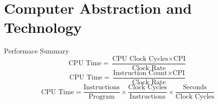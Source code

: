 \section{Computer Abstraction and Technology}
\begin{frame}{Performace Summary}
\begin{equation*}
    \text{CPU Time} = \frac{\text{CPU Clock Cycles} \times \text{CPI}}{\text{Clock Rate}}
\end{equation*}
\begin{equation*}
    \text{CPU Time} = \frac{\text{Instruction Count} \times \text{CPI}}{\text{Clock Rate}}
\end{equation*}
\begin{equation*}
    \text{CPU Time} = \frac{\text{Instructions}}{\text{Program}} 
    \times \frac{\text{Clock Cycles}}{\text{Instructions}} 
    \times \frac{\text{Seconds}}{\text{Clock Cycles}}
\end{equation*}
\end{frame}
